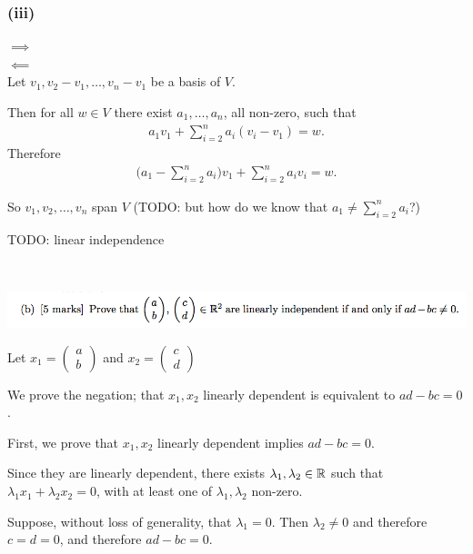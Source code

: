 \documentclass[12pt]{article}
\begin{document}
\newpage
\subsubsection*{(iii)}

$\implies$\\


$\impliedby$\\
Let $v_1, v_2 - v_1, \ldots, v_n - v_1$ be a basis of $V$.

Then for all $w \in V$ there exist $a_1, \ldots, a_n$, all non-zero, such that
\begin{align*}
  a_1v_1 + \sum_{i=2}^n a_i(v_i - v_1) = w.
\end{align*}
Therefore
\begin{align*}
  \Big(a_1 - \sum_{i=2}^na_i\Big)v_1 + \sum_{i=2}^n a_iv_i = w.
\end{align*}

So $v_1, v_2, \ldots, v_n$ span $V$ (TODO: but how do we know that $a_1 \neq \sum_{i=2}^na_i$?)

TODO: linear independence

~\\
\newpage
\begin{mdframed}
\includegraphics[width=400pt]{img/oxford-prelims-2017-A-1-2.png}
\end{mdframed}

\renewcommand{\cvec}[2]{\begin{pmatrix}#1\\#2\end{pmatrix}}

Let $x_1 = \cvec{a}{b}$ and $x_2 = \cvec{c}{d}$

We prove the negation; that $x_1, x_2$ linearly dependent is equivalent to
$ad - bc = 0$.

First, we prove that $x_1, x_2$ linearly dependent implies $ad - bc = 0$.

Since they are linearly dependent, there exists $\lambda_1, \lambda_2 \in \mathbb{R}$
such that $\lambda_1x_1 + \lambda_2x_2 = 0$, with at least one of
$\lambda_1, \lambda_2$ non-zero.

Suppose, without loss of generality, that $\lambda_1 = 0$. Then
$\lambda_2 \neq 0$ and therefore $c = d = 0$, and therefore $ad - bc = 0$.
\end{document}
